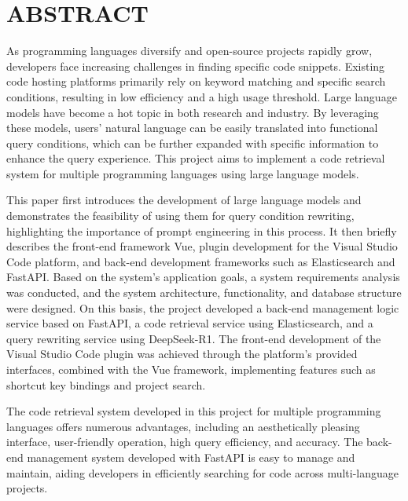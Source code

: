 \documentclass[UTF8,a4paper,12pt]{ctexart}
\numberwithin{equation}{section}
\begin{document}
\section*{ABSTRACT}
As programming languages diversify and open-source projects rapidly grow, developers face increasing challenges in finding specific code snippets. Existing code hosting platforms primarily rely on keyword matching and specific search conditions, resulting in low efficiency and a high usage threshold. Large language models have become a hot topic in both research and industry. By leveraging these models, users' natural language can be easily translated into functional query conditions, which can be further expanded with specific information to enhance the query experience. This project aims to implement a code retrieval system for multiple programming languages using large language models.\par

This paper first introduces the development of large language models and demonstrates the feasibility of using them for query condition rewriting, highlighting the importance of prompt engineering in this process. It then briefly describes the front-end framework Vue, plugin development for the Visual Studio Code platform, and back-end development frameworks such as Elasticsearch and FastAPI. Based on the system's application goals, a system requirements analysis was conducted, and the system architecture, functionality, and database structure were designed. On this basis, the project developed a back-end management logic service based on FastAPI, a code retrieval service using Elasticsearch, and a query rewriting service using DeepSeek-R1. The front-end development of the Visual Studio Code plugin was achieved through the platform's provided interfaces, combined with the Vue framework, implementing features such as shortcut key bindings and project search.\par

The code retrieval system developed in this project for multiple programming languages offers numerous advantages, including an aesthetically pleasing interface, user-friendly operation, high query efficiency, and accuracy. The back-end management system developed with FastAPI is easy to manage and maintain, aiding developers in efficiently searching for code across multi-language projects.\par 
\end{document}
